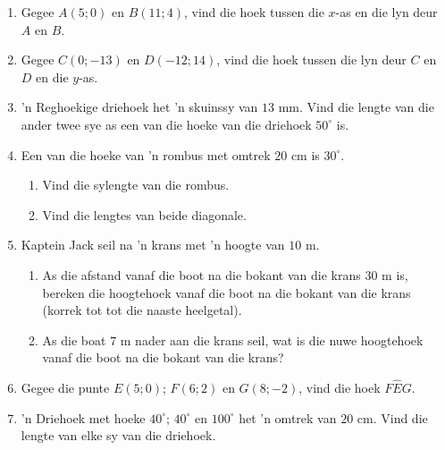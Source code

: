 \begin{eocexercises}{}
\begin{enumerate}[itemsep=6pt, label=\textbf{\arabic*}. ]
\item Gegee $A(5;0)$ en $B(11;4)$, vind die hoek tussen die $x$-as en die lyn deur $A$ en $B$. 
\item Gegee $C(0;-13)$ en $D(-12;14)$, vind die hoek tussen die lyn deur $C$ en $D$ en die $y$-as. 


\item 'n Reghoekige driehoek het 'n skuinssy van $13$ mm. Vind die lengte van die ander twee sye as een van die hoeke van die driehoek $50^{\circ}$ is.
\item Een van die hoeke van 'n rombus met omtrek $20$ cm is $30^{\circ}$. 
\begin{enumerate}[noitemsep, label=\textbf{(\alph*)} ]
\item Vind die sylengte van die rombus. 
\item Vind die lengtes van beide diagonale. 
\end{enumerate} 
\item Kaptein Jack seil na 'n krans met 'n hoogte van $10$ m. 
\begin{enumerate}[noitemsep, label=\textbf{(\alph*)} ] 
\item As die afstand vanaf die boot na die bokant van die krans $30$ m is, bereken die hoogtehoek vanaf die boot na die bokant van die krans (korrek tot tot die naaste heelgetal).
\item As die boat $7$ m nader aan die krans seil, wat is die nuwe hoogtehoek vanaf die boot na die bokant van die krans? 
\end{enumerate} 
\item Gegee die punte $E(5;0)$; $F(6;2)$ en $G(8;-2)$, vind die hoek $F\hat{E}G$. 
\item  'n Driehoek met hoeke $40^{\circ}$; $40^{\circ}$ en $100^{\circ}$ het 'n omtrek van $20$ cm. Vind die lengte van elke sy  van die driehoek. 

\end{enumerate}

\end{eocexercises}




















